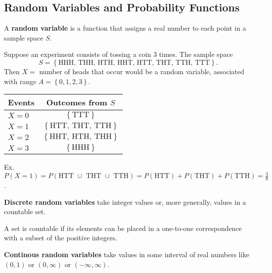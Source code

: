 \subsection{Random Variables and Probability Functions}

\begin{definition}
    A \textbf{random variable} is a function that assigns a real number to each point
    in a sample space $S$.
\end{definition}

\begin{example}
    Suppose an experiment consists of tossing a coin 3 times. The sample space
    \[S = \left\{ \text{HHH, THH, HTH, HHT, HTT, THT, TTH, TTT} \right\}.\]
    Then $X = $ number of heads that occur would be a random variable, associated with range $A=\left\{ 0,1,2,3 \right\}$. \vspace{-5mm} \\
    \begin{center}
        \begin{tabular}{l|*{1}{c}}
            Events & Outcomes from $S$ \\
            \hline
            $X=0$ & $\left\{ \text{TTT} \right\}$ \\
            $X=1$ & $\left\{ \text{HTT, THT, TTH} \right\}$ \\
            $X=2$ & $\left\{ \text{HHT, HTH, THH} \right\}$ \\
            $X=3$ & $\left\{ \text{HHH} \right\}$
        \end{tabular}
    \end{center}
    Ex. $P(X=1) = P(\text{HTT $\cup$ THT $\cup$ TTH}) = P(\text{HTT}) + P(\text{THT}) + P(\text{TTH}) = \frac{3}{8}$.
\end{example}

\begin{definition}
    \textbf{Discrete random variables} take integer values or, more generally, values
    in a countable set.
\end{definition}

\begin{note}
    A set is countable if its elements can be placed in a one-to-one correspondence
    with a subset of the positive integers.
\end{note}

\begin{definition}
    \textbf{Continous random variables} take values in some interval of real numbers like
    $(0, 1)$ or $(0, \infty)$ or $(-\infty, \infty)$. 
\end{definition}

